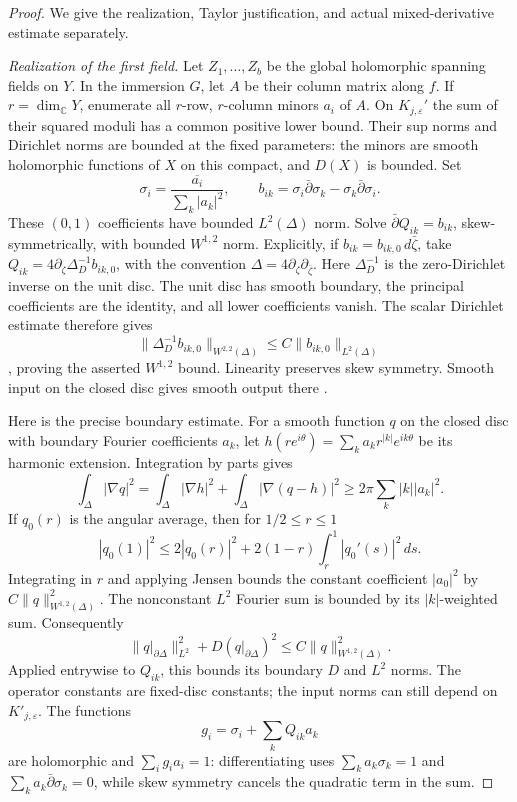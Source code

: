 \documentclass[11pt]{article}
\theoremstyle{definition}
\theoremstyle{remark}
\newcommand{\C}{\mathbb C}
\newcommand{\eps}{\varepsilon}
\numberwithin{equation}{section}
\begin{document}
\begin{proof}
We give the realization, Taylor justification, and actual mixed-derivative
estimate separately.

\emph{Realization of the first field.}
Let $Z_1,\ldots,Z_b$ be the global holomorphic spanning fields on $Y$.
In the immersion $G$, let $A$ be their column matrix along $f$.
If $r=\dim_\C Y$, enumerate all $r$-row, $r$-column minors $a_i$ of $A$.
On $K_{j,\eps}'$ the sum of their squared moduli has a common positive
lower bound.
Their sup norms and Dirichlet norms are bounded at the fixed parameters:
the minors are smooth holomorphic functions of $X$ on this compact,
and $D(X)$ is bounded.  Set
\[
 \sigma_i=\frac{\overline{a_i}}{\sum_k|a_k|^2},\qquad
 b_{ik}=\sigma_i\bar\partial\sigma_k-
 \sigma_k\bar\partial\sigma_i.
\]
These $(0,1)$ coefficients have bounded $L^2(\Delta)$ norm.  Solve
$\bar\partial Q_{ik}=b_{ik}$, skew-symmetrically, with bounded
$W^{1,2}$ norm.  Explicitly, if $b_{ik}=b_{ik,0}\,d\bar\zeta$,
take $Q_{ik}=4\partial_\zeta\Delta_D^{-1}b_{ik,0}$, with the
convention $\Delta=4\partial_\zeta\partial_{\bar\zeta}$.
Here $\Delta_D^{-1}$ is the zero-Dirichlet inverse on the unit disc.
The unit disc has smooth boundary, the principal coefficients are
the identity, and all lower coefficients vanish.  The scalar
Dirichlet estimate therefore gives
\[
 \|\Delta_D^{-1}b_{ik,0}\|_{W^{2,2}(\Delta)}
 \le C\|b_{ik,0}\|_{L^2(\Delta)}
\]
\cite[Theorem~9.15 and Lemma~9.17]{GilbargTrudinger}, proving the
asserted $W^{1,2}$ bound.  Linearity preserves skew symmetry.
Smooth input on the closed disc gives smooth output there
\cite[Theorem~8.13]{GilbargTrudinger}.

Here is the precise boundary estimate.  For a smooth function $q$
on the closed disc with boundary Fourier coefficients $a_k$, let
$h(re^{i\theta})=\sum_k a_kr^{|k|}e^{ik\theta}$ be its harmonic
extension.  Integration by parts gives
\[
 \int_\Delta|\nabla q|^2
 =\int_\Delta|\nabla h|^2+\int_\Delta|\nabla(q-h)|^2
 \ge2\pi\sum_k|k||a_k|^2.
\]
If $q_0(r)$ is the angular average, then for $1/2\le r\le1$
\[
 |q_0(1)|^2\le2|q_0(r)|^2
          +2(1-r)\int_r^1|q_0'(s)|^2\,ds.
\]
Integrating in $r$ and applying Jensen bounds the constant
coefficient $|a_0|^2$ by $C\|q\|_{W^{1,2}(\Delta)}^2$.
The nonconstant $L^2$ Fourier sum is bounded by its $|k|$-weighted
sum.  Consequently
\[
 \|q|_{\partial\Delta}\|_{L^2}^2+D(q|_{\partial\Delta})^2
 \le C\|q\|_{W^{1,2}(\Delta)}^2.
\]
Applied entrywise to $Q_{ik}$, this bounds its boundary $D$ and
$L^2$ norms.  The operator constants are fixed-disc constants;
the input norms can still depend on $K'_{j,\eps}$.
The functions
\[
 g_i=\sigma_i+\sum_kQ_{ik}a_k
\]
are holomorphic and $\sum_i g_i a_i=1$: differentiating uses
$\sum_k a_k\sigma_k=1$ and
$\sum_k a_k\bar\partial\sigma_k=0$, while skew symmetry cancels the
quadratic term in the sum.


\end{proof}
\end{document}
